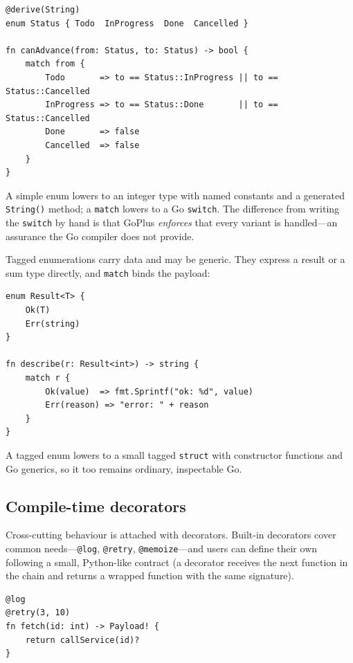 \documentclass[11pt,a4paper]{article}
\begin{document}
\begin{lstlisting}[language=GoPlus,caption={An enum state machine with an exhaustive match.}]
@derive(String)
enum Status { Todo  InProgress  Done  Cancelled }

fn canAdvance(from: Status, to: Status) -> bool {
    match from {
        Todo       => to == Status::InProgress || to == Status::Cancelled
        InProgress => to == Status::Done       || to == Status::Cancelled
        Done       => false
        Cancelled  => false
    }
}
\end{lstlisting}

A simple enum lowers to an integer type with named constants and a generated
\texttt{String()} method; a \texttt{match} lowers to a Go \texttt{switch}. The
difference from writing the \texttt{switch} by hand is that GoPlus \emph{enforces}
that every variant is handled---an assurance the Go compiler does not provide.

Tagged enumerations carry data and may be generic. They express a result or a
sum type directly, and \texttt{match} binds the payload:

\begin{lstlisting}[language=GoPlus,caption={A generic tagged enumeration.}]
enum Result<T> {
    Ok(T)
    Err(string)
}

fn describe(r: Result<int>) -> string {
    match r {
        Ok(value)  => fmt.Sprintf("ok: %d", value)
        Err(reason) => "error: " + reason
    }
}
\end{lstlisting}

A tagged enum lowers to a small tagged \texttt{struct} with constructor functions
and Go generics, so it too remains ordinary, inspectable Go.

\subsection{Compile-time decorators}
Cross-cutting behaviour is attached with decorators. Built-in decorators cover
common needs---\texttt{@log}, \texttt{@retry}, \texttt{@memoize}---and users can
define their own following a small, Python-like contract (a decorator receives
the next function in the chain and returns a wrapped function with the same
signature).

\begin{lstlisting}[language=GoPlus,caption={Decorators replace hand-rolled wrappers.}]
@log
@retry(3, 10)
fn fetch(id: int) -> Payload! {
    return callService(id)?
}
\end{lstlisting}
\end{document}
